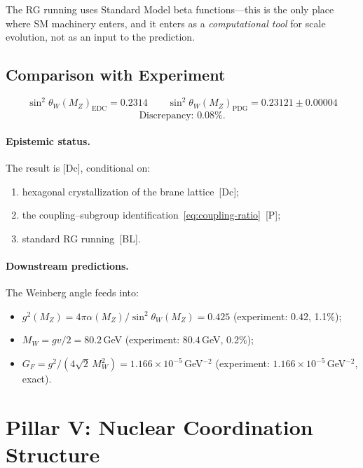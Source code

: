 \documentclass[12pt,a4paper]{article}
\theoremstyle{definition}
\theoremstyle{remark}
\newcommand{\tagDc}{\textsf{[Dc]}}
\newcommand{\tagP}{\textsf{[P]}}
\newcommand{\tagBL}{\textsf{[BL]}}
\newcommand{\stw}{\sin^2\!\theta_W}
\begin{document}
The RG running uses Standard Model beta functions---this is
the only place where SM machinery enters, and it enters as a
\emph{computational tool} for scale evolution, not as an input
to the prediction.

\subsection{Comparison with Experiment}

\begin{equation}
  \stw(M_Z)_{\mathrm{EDC}} = 0.2314
  \qquad
  \stw(M_Z)_{\mathrm{PDG}} = 0.23121 \pm 0.00004
\end{equation}
\[
  \text{Discrepancy: } 0.08\%.
\]

\paragraph{Epistemic status.}
The result is \tagDc, conditional on:
\begin{enumerate}[nosep]
\item hexagonal crystallization of the brane lattice~\tagDc;
\item the coupling--subgroup identification~\eqref{eq:coupling-ratio}~\tagP;
\item standard RG running~\tagBL.
\end{enumerate}

\paragraph{Downstream predictions.}
The Weinberg angle feeds into:
\begin{itemize}[nosep]
\item $g^2(M_Z) = 4\pi\alpha(M_Z)/\stw(M_Z) = 0.425$
  (experiment: $0.42$, 1.1\%);
\item $M_W = gv/2 = 80.2$\,GeV
  (experiment: $80.4$\,GeV, 0.2\%);
\item $G_F = g^2/(4\sqrt{2}\,M_W^2) = 1.166 \times 10^{-5}$\,GeV$^{-2}$
  (experiment: $1.166 \times 10^{-5}$\,GeV$^{-2}$, exact).
\end{itemize}

\section{Pillar V: Nuclear Coordination Structure}
\label{sec:coordination}
\end{document}

